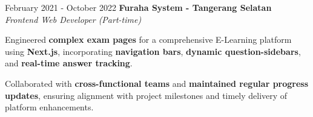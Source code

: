 \documentclass[../main.tex]{subfiles}
\begin{document}
\vspace{0.40 cm}

\begin{twocolentry}{February 2021 - October 2022}
    \textbf{Furaha System \color{Gray}- Tangerang Selatan}\\
    \textit{Frontend Web Developer (Part-time)}
\end{twocolentry}

\vspace{0.10 cm}
\begin{onecolentry}
\begin{highlights}
    \item Engineered \textbf{complex exam pages} for a comprehensive E-Learning platform using \textbf{Next.js}, incorporating \textbf{navigation bars}, \textbf{dynamic question-sidebars}, and \textbf{real-time answer tracking}.
    \item Collaborated with \textbf{cross-functional teams} and \textbf{maintained regular progress updates}, ensuring alignment with project milestones and timely delivery of platform enhancements.
\end{highlights}
\end{onecolentry}
\end{document}
